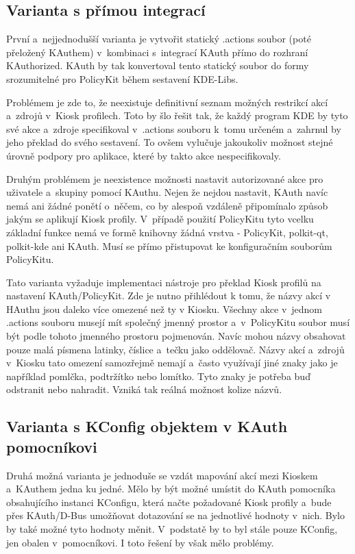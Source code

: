 \subsection*{Varianta s přímou integrací}
První a~nejjednodušší varianta je vytvořit statický .actions soubor (poté přeložený KAuthem) v~kombinaci s~integrací KAuth přímo do rozhraní KAuthorized. KAuth by tak konvertoval tento statický soubor do formy srozumitelné pro PolicyKit během sestavení KDE-Libs.

Problémem je zde to, že neexistuje definitivní seznam možných restrikcí akcí a~zdrojů v~Kiosk profilech. Toto by šlo řešit tak, že každý program KDE by tyto své akce a~zdroje specifikoval v~.actions souboru k~tomu určeném a~zahrnul by jeho překlad do svého sestavení. To ovšem vylučuje jakoukoliv možnost stejné úrovně podpory pro aplikace, které by takto akce nespecifikovaly.

Druhým problémem je neexistence možnosti nastavit autorizované akce pro uživatele a~skupiny pomocí KAuthu. Nejen že nejdou nastavit, KAuth navíc nemá ani žádné ponětí o~něčem, co by alespoň vzdáleně připomínalo způsob jakým se aplikují Kiosk profily. V~případě použití PolicyKitu tyto vcelku základní funkce nemá ve formě knihovny žádná vrstva - PolicyKit, polkit-qt, polkit-kde ani KAuth. Musí se přímo přistupovat ke konfiguračním souborům PolicyKitu.

Tato varianta vyžaduje implementaci nástroje pro překlad Kiosk profilů na nastavení KAuth/PolicyKit. Zde je nutno přihlédout k tomu, že názvy akcí v HAuthu jsou daleko více omezené než ty v Kiosku. Všechny akce v~jednom .actions souboru musejí mít společný jmenný prostor a~v~PolicyKitu soubor musí být podle tohoto jmenného prostoru pojmenován. Navíc mohou názvy obsahovat pouze malá písmena latinky, číslice a~tečku jako oddělovač. Názvy akcí a~zdrojů v~Kiosku tato omezení samozřejmě nemají a~často využívají jiné znaky jako je například pomlčka, podtržítko nebo lomítko. Tyto znaky je potřeba buď odstranit nebo nahradit. Vzniká tak reálná možnost kolize názvů.

\subsection*{Varianta s KConfig objektem v KAuth pomocníkovi}
Druhá možná varianta je jednoduše se vzdát mapování akcí mezi Kioskem a~KAuthem jedna ku jedné. Mělo by být možné umístit do KAuth pomocníka obsahujícího instanci KConfigu, která načte požadované Kiosk profily a~bude přes KAuth/D-Bus umožňovat dotazování se na jednotlivé hodnoty v~nich. Bylo by také možné tyto hodnoty měnit. V~podstatě by to byl stále pouze KConfig, jen obalen v~pomocníkovi. I toto řešení by však mělo problémy.

